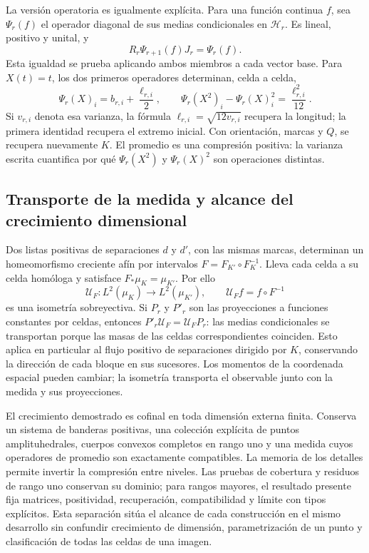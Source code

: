 La versión operatoria es igualmente explícita. Para una función continua
\(f\), sea \(\Psi_r(f)\) el operador diagonal de sus medias
condicionales en \(\mathcal H_r\). Es lineal, positivo y unital, y
\[
 R_r\Psi_{r+1}(f)J_r=\Psi_r(f).
\]
Esta igualdad se prueba aplicando ambos miembros a cada vector base.
Para \(X(t)=t\), los dos primeros operadores determinan, celda a
celda,
\[
 \Psi_r(X)_i=b_{r,i}+\frac{\ell_{r,i}}2,\qquad
 \Psi_r(X^2)_i-\Psi_r(X)_i^2=\frac{\ell_{r,i}^2}{12}.
\]
Si \(v_{r,i}\) denota esa varianza, la fórmula
\(\ell_{r,i}=\sqrt{12v_{r,i}}\) recupera la longitud; la
primera identidad recupera el extremo inicial. Con orientación, marcas y \(Q\),
se recupera nuevamente \(K\). El promedio es una compresión positiva:
la varianza escrita cuantifica por qué \(\Psi_r(X^2)\) y
\(\Psi_r(X)^2\) son operaciones distintas.

\subsection{Transporte de la medida y alcance del crecimiento dimensional}

Dos listas positivas de separaciones \(d\) y \(d'\), con las
mismas marcas, determinan un homeomorfismo creciente afín por intervalos
\(F=F_{K'}\circ F_K^{-1}\). Lleva cada celda a su celda homóloga
y satisface \(F_*\mu_K=\mu_{K'}\). Por ello
\[
 \mathcal U_F:L^2(\mu_K)\longrightarrow L^2(\mu_{K'}),
 \qquad\mathcal U_F f=f\circ F^{-1}
\]
es una isometría sobreyectiva. Si \(P_r\) y \(P'_r\) son las
proyecciones a funciones constantes por celdas, entonces
\(P'_r\mathcal U_F=\mathcal U_FP_r\): las medias condicionales
se transportan porque las masas de las celdas correspondientes coinciden.
Esto aplica en particular al flujo positivo de separaciones dirigido por
\(K\), conservando la dirección de cada bloque en sus sucesores. Los
momentos de la coordenada espacial pueden cambiar; la isometría transporta
el observable junto con la medida y sus proyecciones.

El crecimiento demostrado es cofinal en toda dimensión externa finita.
Conserva un sistema de banderas positivas, una colección explícita de
puntos amplituhedrales, cuerpos convexos completos en rango uno y una
medida cuyos operadores de promedio son exactamente compatibles. La
memoria de los detalles permite invertir la compresión entre niveles.
Las pruebas de cobertura y residuos de rango uno conservan su dominio;
para rangos mayores, el resultado presente fija matrices, positividad,
recuperación, compatibilidad y límite con tipos explícitos. Esta
separación sitúa el alcance de cada construcción en el mismo desarrollo
sin confundir crecimiento de dimensión, parametrización de un punto y
clasificación de todas las celdas de una imagen.
